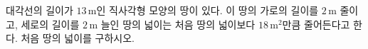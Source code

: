대각선의 길이가 $13\,\mathrm{m}$인 직사각형 모양의 땅이 있다. 이 땅의 가로의 길이를 $2\,\mathrm{m}$ 줄이고, 세로의 길이를 $2\,\mathrm{m}$ 늘인 땅의 넓이는 처음 땅의 넓이보다 $18\,\mathrm{m}^2$만큼 줄어든다고 한다. 처음 땅의 넓이를 구하시오.
